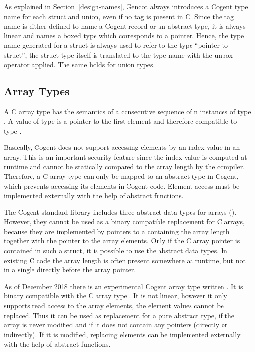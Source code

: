 As explained in Section~\ref{design-names}, Gencot always introduces a Cogent type name for each struct and union,
even if no tag is present in C. Since the tag name is either defined to name a Cogent record or an abstract type,
it is always linear and names a boxed type which corresponds to a pointer. Hence, the type name generated for a struct
is always used to refer to the type ``pointer to struct'', the struct type itself is translated to the type name 
with the unbox operator applied. The same holds for union types.

\subsection{Array Types}
\label{design-types-array}

A C array type  has the semantics of a consecutive sequence of n instances of type . A value
of type  is a pointer to the first element and therefore compatible to type .

Basically, Cogent does not support accessing elements by an index value in an array. 
This is an important security feature since the index value is computed at runtime and cannot be statically 
compared to the array length by the compiler. Therefore, a C array type can only be mapped to an abstract type 
in Cogent, which prevents accessing its elements in Cogent code. Element access must be implemented externally 
with the help of abstract functions.

The Cogent standard library includes three abstract data types for arrays (). 
However, they cannot be used as a binary compatible replacement for C arrays, because they are implemented by 
pointers to a  containing the array length together with the pointer to the array elements. 
Only if the C array pointer is contained in such a struct, it is possible to use the abstract data types. 
In existing C code the array length is often present somewhere at runtime, but not in a single 
directly before the array pointer.

As of December 2018 there is an experimental Cogent array type written . It is binary compatible 
with the C array type . It is not linear, however it only supports read access to the array elements, 
the element values cannot be replaced. Thus it can be used as replacement for a pure abstract type, if the array 
is never modified and if it does not contain any pointers (directly or indirectly). If it is modified, replacing
elements can be implemented externally with the help of abstract functions.

